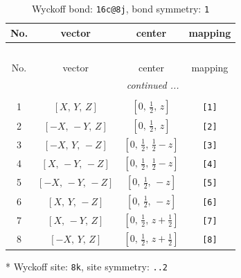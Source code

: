 \documentclass[fleqn,8pt]{jsarticle}
\begin{document}
\renewcommand{\arraystretch}{1.2}
\begin{longtable}{cccc}
\caption{Wyckoff bond: {\tt 16c@8j}, bond symmetry: {\tt 1}}
 \\
 \hline \hline
No. & vector & center & mapping \\ \hline \endfirsthead

\multicolumn{3}{l}{\tablename\ \thetable{}} \\
 \hline \hline
No. & vector & center & mapping \\ \hline \endhead

 \hline \hline
\multicolumn{3}{r}{\footnotesize\it continued ...} \\ \endfoot

 \hline \hline
\multicolumn{3}{r}{} \\ \endlastfoot

1 & $\left[ X,\, Y,\, Z \right]$ & $\left[ 0,\, \frac{1}{2},\, z \right]$ & {\tt [1]} \\ \hline
2 & $\left[ - X,\, - Y,\, Z \right]$ & $\left[ 0,\, \frac{1}{2},\, z \right]$ & {\tt [2]} \\ \hline
3 & $\left[ - X,\, Y,\, - Z \right]$ & $\left[ 0,\, \frac{1}{2},\, \frac{1}{2} - z \right]$ & {\tt [3]} \\ \hline
4 & $\left[ X,\, - Y,\, - Z \right]$ & $\left[ 0,\, \frac{1}{2},\, \frac{1}{2} - z \right]$ & {\tt [4]} \\ \hline
5 & $\left[ - X,\, - Y,\, - Z \right]$ & $\left[ 0,\, \frac{1}{2},\, - z \right]$ & {\tt [5]} \\ \hline
6 & $\left[ X,\, Y,\, - Z \right]$ & $\left[ 0,\, \frac{1}{2},\, - z \right]$ & {\tt [6]} \\ \hline
7 & $\left[ X,\, - Y,\, Z \right]$ & $\left[ 0,\, \frac{1}{2},\, z + \frac{1}{2} \right]$ & {\tt [7]} \\ \hline
8 & $\left[ - X,\, Y,\, Z \right]$ & $\left[ 0,\, \frac{1}{2},\, z + \frac{1}{2} \right]$ & {\tt [8]} \\
\end{longtable}
* Wyckoff site: {\tt 8k}, site symmetry: {\tt ..2}
\renewcommand{\arraystretch}{1.2}
\end{document}
